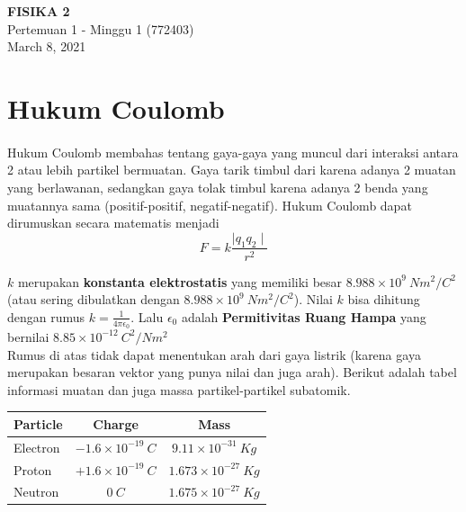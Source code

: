\documentclass[twocolumn, 11pt]{article}%
\begin{document}
\begin{strip}
  \vspace*{\dimexpr-\stripsep}
  \begin{center}
      \Large\textbf{FISIKA 2}\\
      \large{Pertemuan 1 - Minggu 1 (772403)}\\
      \large{March 8, 2021}
   \end{center}
\end{strip}

\section{Hukum Coulomb}
        \paragraph{ } Hukum Coulomb membahas tentang gaya-gaya yang muncul dari interaksi antara 2 atau lebih partikel bermuatan. Gaya tarik timbul dari karena adanya 2 muatan yang berlawanan, sedangkan gaya tolak timbul karena adanya 2 benda yang muatannya sama (positif-positif, negatif-negatif). Hukum Coulomb dapat dirumuskan secara matematis menjadi
        \[F = k \frac{\mid q_1 q_2 \mid}{r^2} \]

        $k$ merupakan \textbf{konstanta elektrostatis} yang memiliki besar $8.988 \times 10^9\ Nm^2/C^2$ (atau sering dibulatkan dengan $8.988 \times 10^9\ Nm^2/C^2$). Nilai $k$ bisa dihitung dengan rumus $\displaystyle k=\frac{1}{4\pi \epsilon_0}$. Lalu $\epsilon_0$ adalah \textbf{Permitivitas Ruang Hampa} yang bernilai $8.85 \times 10^{-12}\ C^2/Nm^2$\\

        Rumus di atas tidak dapat menentukan arah dari gaya listrik (karena gaya merupakan besaran vektor yang punya nilai dan juga arah). Berikut adalah tabel informasi muatan dan juga massa partikel-partikel subatomik.

        \begin{table}[h!]
            \begin{center}
                \begin{tabular}{l|c|c}
                    \textbf{Particle} & \textbf{Charge} & \textbf{Mass}\\
                    \hline
                    Electron & $-1.6 \times 10^{-19}\ C$ & $9.11 \times 10^{-31}\ Kg$\\
                    Proton & $+1.6 \times 10^{-19}\ C$ & $1.673 \times 10^{-27}\ Kg$\\
                    Neutron & $0\ C$ & $1.675 \times 10^{-27}\ Kg$
                \end{tabular}
            \end{center}
        \end{table}
\end{document}
